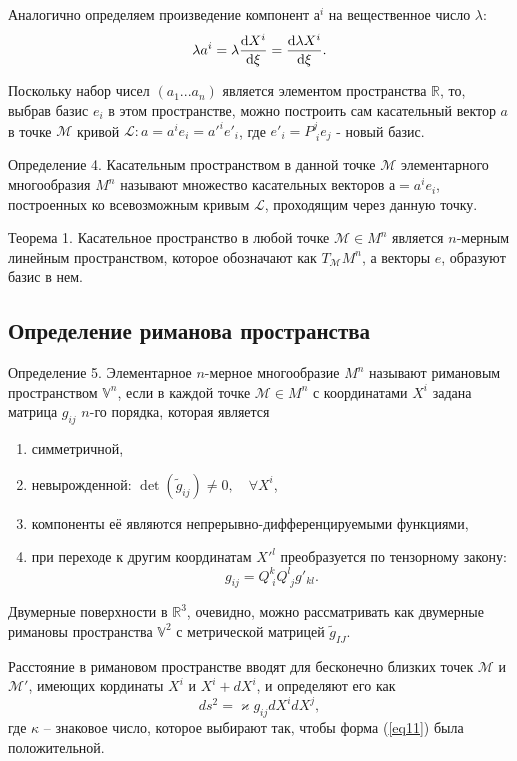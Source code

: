 \documentclass[14pt,a4paper]{scrartcl}
\begin{document}
Аналогично определяем произведение компонент $а^i$ на вещественное число $\lambda$:
\begin{equation}\label{eq9}
	\lambda a^i = \lambda \dv{X^i}{\xi} = \dv{\lambda X^i}{\xi}.
\end{equation}

Поскольку набор чисел $(a_1 ...a_n)$ является элементом пространства $\mathbb{R}$, то, выбрав базис $e_i$ в этом пространстве, можно построить сам касательный вектор $a$ в точке $\mathcal{M}$ кривой $\mathcal{L}: a = a^ie_i = a'^ie'_i$, где $e'_i = P_{\; i}^j e_j$ - новый базис.


Определение 4. Касательным пространством в данной точке $\mathcal{M}$ элементарного многообразия $M^n$ называют множество касательных векторов $а = a^ie_i$, построенных ко всевозможным кривым $\mathcal{L}$, проходящим через данную точку.


Теорема 1. Касательное пространство в любой точке $\mathcal{M} \in M^n$ является $n$-мерным линейным пространством, которое обозначают как $T_{\mathcal{M}}M^n$, а векторы $e$, образуют базис в нем.


\subsection{Определение риманова пространства}
Определение 5. Элементарное $n$-мерное многообразие $M^n$ называют римановым пространством $\mathbb{V}^n$, если в каждой точке $\mathcal{M} \in M^n$ с координатами $X^i$ задана матрица $g_{ij}$ $n$-го порядка, которая является
\begin{enumerate}
	\item симметричной,
	\item невырожденной: $\det (\tilde{g}_{ij}) \neq 0, \quad \forall X^i$,
	\item компоненты её являются непрерывно-дифференцируемыми функциями,
	\item при переходе к другим координатам $X'^l$ преобразуется по тензорному закону:
	\begin{equation}\label{eq10}
		g_{ij} = Q_{\; i}^k Q_{\; j}^l g'_{kl}.
	\end{equation}
\end{enumerate}


Двумерные поверхности в $\mathbb{R}^3$, очевидно, можно рассматривать как двумерные римановы пространства $\mathbb{V}^2$ с метрической матрицей $\tilde{g}_{IJ}$.

Расстояние в римановом пространстве вводят для бесконечно близких точек $\mathcal{M}$ и $\mathcal{M'}$, имеющих кординаты $X^i$ и $X^i + dX^i$, и определяют его как
\begin{equation}\label{eq11}
	ds^2 = \varkappa g_{ij} dX^idX^j,
\end{equation}
где $\kappa$ -- знаковое число, которое выбирают так, чтобы форма (\ref{eq11}) была положительной.
\end{document}
